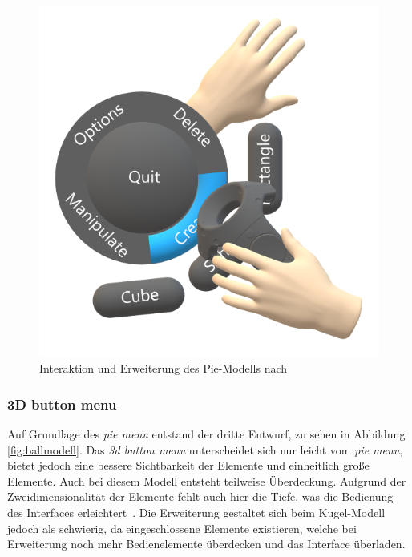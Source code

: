 \begin{figure}[h]
\captionsetup{width=.7\linewidth}
\includegraphics[scale=0.5]{Bilder/Hauptteil/konzept11a}
\centering
\caption{Interaktion und Erweiterung des Pie-Modells nach~\citep[p.~10]{wheelpickerpiemenu}}
\label{fig:piemenu2}
\end{figure}

\subsubsection*{3D button menu}
\noindent Auf Grundlage des \textit{pie menu} entstand der dritte Entwurf, zu sehen in Abbildung \ref{fig:ballmodell}. Das \textit{3d button menu} unterscheidet sich nur leicht vom \textit{pie menu}, bietet jedoch eine bessere Sichtbarkeit der Elemente und einheitlich große Elemente. Auch bei diesem Modell entsteht teilweise Überdeckung. Aufgrund der Zweidimensionalität der Elemente fehlt auch hier die Tiefe, was die Bedienung des Interfaces erleichtert~\cite{theoryandpracticebook}. Die Erweiterung gestaltet sich beim Kugel-Modell jedoch als schwierig, da eingeschlossene Elemente existieren, welche bei Erweiterung noch mehr Bedienelemente überdecken und das Interface überladen.

